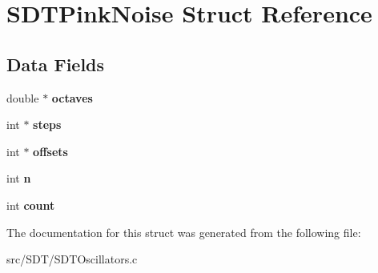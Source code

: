 \hypertarget{struct_s_d_t_pink_noise}{}\section{S\+D\+T\+Pink\+Noise Struct Reference}
\label{struct_s_d_t_pink_noise}
\subsection*{Data Fields}
\begin{DoxyCompactItemize}
\item 
\hypertarget{struct_s_d_t_pink_noise_aedc3d909fa93d55001d9142f1ffb5dfe}{}double $\ast$ {\bfseries octaves}\label{struct_s_d_t_pink_noise_aedc3d909fa93d55001d9142f1ffb5dfe}

\item 
\hypertarget{struct_s_d_t_pink_noise_a914b2236e0f911c34e8ce5045d4e054b}{}int $\ast$ {\bfseries steps}\label{struct_s_d_t_pink_noise_a914b2236e0f911c34e8ce5045d4e054b}

\item 
\hypertarget{struct_s_d_t_pink_noise_a8396f3b060af3be828b64d4386221b1d}{}int $\ast$ {\bfseries offsets}\label{struct_s_d_t_pink_noise_a8396f3b060af3be828b64d4386221b1d}

\item 
\hypertarget{struct_s_d_t_pink_noise_a76f11d9a0a47b94f72c2d0e77fb32240}{}int {\bfseries n}\label{struct_s_d_t_pink_noise_a76f11d9a0a47b94f72c2d0e77fb32240}

\item 
\hypertarget{struct_s_d_t_pink_noise_ad43c3812e6d13e0518d9f8b8f463ffcf}{}int {\bfseries count}\label{struct_s_d_t_pink_noise_ad43c3812e6d13e0518d9f8b8f463ffcf}

\end{DoxyCompactItemize}


The documentation for this struct was generated from the following file\+:\begin{DoxyCompactItemize}
\item 
src/\+S\+D\+T/S\+D\+T\+Oscillators.\+c\end{DoxyCompactItemize}
